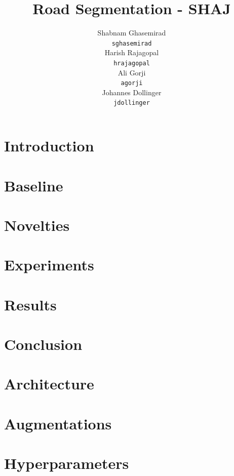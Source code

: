 \documentclass[twocolumn]{article}
\title{Road Segmentation - SHAJ}
\author{
  Shabnam Ghasemirad\\
  \texttt{sghasemirad} \\
   \And
  Harish Rajagopal \\
  \texttt{hrajagopal} \\
   \And
  Ali Gorji \\
  \texttt{agorji} \\
   \And
  Johannes Dollinger \\
  \texttt{jdollinger} \\
}
\begin{document}
\makeatletter
\let\save@parmoderr\@parmoderr
\def\@parmoderr{}
\@twocolumnfalse
\twocolumn[\maketitle]
\let\@parmoderr\save@parmoderr
\makeatother

\section{Introduction} \label{intro}


\section{Baseline}\label{section:baselines}


\section{Novelties}\label{section:novelties}


\section{Experiments}\label{section:experiments}


\section{Results}\label{section:results}


\section{Conclusion}\label{section:conclusion}


\newpage

\small
\printbibliography{}

\appendix

\section{Architecture}\label{appendix:architecture}


\section{Augmentations}\label{appendix:augmentations}


\section{Hyperparameters}\label{appendix:hyper-params}

\end{document}

